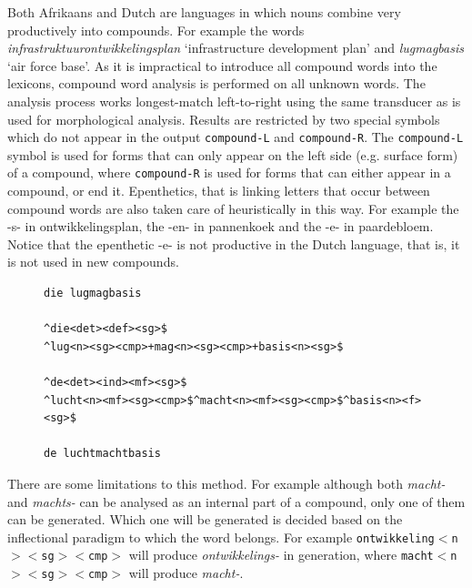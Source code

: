 \documentclass[11pt]{article}
\begin{document}

Both Afrikaans and Dutch are languages in which nouns combine very
productively into compounds. For example the words {\em infrastruktuurontwikkelingsplan}
`infrastructure development plan' and {\em lugmagbasis}
`air force base'. As it is impractical to introduce
all compound words into the lexicons, compound word analysis is performed on
all unknown words. The analysis process works longest-match left-to-right
using the same transducer as is used for morphological analysis.
Results are restricted by two special
symbols which do not appear in the output {\small {\tt compound-L}} and {\small {\tt compound-R}}.
The {\small {\tt compound-L}} symbol is used for forms that can only appear on the
left side (e.g. surface form) of a compound, where {\small {\tt compound-R}} is
used for forms that can either appear in a compound, or end it.
Epenthetics, that is linking letters that occur between compound words
are also taken care of heuristically in this way. For example the -s-
in ontwikkelingsplan, the -en- in pannenkoek and the -e- in paardebloem.
 Notice that the epenthetic -e- is not productive in the Dutch language, that is, it is not used in new compounds.


\begin{figure}
\begin{small}
\begin{verbatim}
die lugmagbasis

^die<det><def><sg>$
^lug<n><sg><cmp>+mag<n><sg><cmp>+basis<n><sg>$

^de<det><ind><mf><sg>$
^lucht<n><mf><sg><cmp>$^macht<n><mf><sg><cmp>$^basis<n><f><sg>$

de luchtmachtbasis
\end{verbatim}
\end{small}
\end{figure}

There are some limitations to this method. For example although
both {\em macht-} and {\em machts-} can be analysed as an internal part
of a compound, only one of them can be generated. Which one will be generated
is decided based on the inflectional paradigm to which the word belongs. For
example {\small {\tt ontwikkeling$<$n$><$sg$><$cmp$>$}} will produce {\em ontwikkelings-} in generation,
where {\small {\tt macht$<$n$><$sg$><$cmp$>$}} will produce {\em macht-}.
\end{document}
